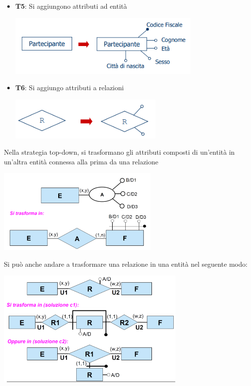 \documentclass[12pt]{article}
\begin{document}
\begin{itemize}
\begin{center}
    \end{center}
    \item \textbf{T5}: Si aggiungono attributi ad entità
    \begin{center}
        \includegraphics[width = 0.75\textwidth]{Images/61.PNG}
    \end{center}
    \item \textbf{T6}: Si aggiungo attributi a relazioni
    \begin{center}
        \includegraphics[width = 0.60\textwidth]{Images/62.PNG}
    \end{center}
\end{itemize}
Nella strategia top-down, si trasformano gli attributi composti di un'entità in un'altra entità connessa alla prima da una relazione
\begin{center}
    \includegraphics[width = 0.60\textwidth]{Images/63.PNG}
\end{center}
Si può anche andare a trasformare una relazione in una entità nel seguente modo:
\begin{center}
    \includegraphics[width = 0.70\textwidth]{Images/64.PNG}
\end{center}
\end{document}
